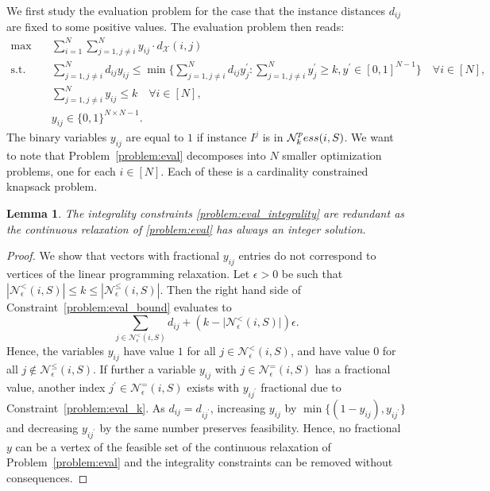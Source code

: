 \documentclass[10pt,a4paper]{amsart}
\newtheorem{lemma}{Lemma}
\newcommand{\FRil}[1]{\todo[color=black, textcolor=white, inline, author=FR]{#1}}
\newcommand{\X}{{\mathcal{X}}} %
\newcommand{\fsel}{S} %
\newcommand{\instanceindex}{i}
\newcommand{\instanceindextwo}{j}
\newcommand{\neighbour}{\ensuremath{\mathcal{N}}}
\newcommand{\sEpsBorder}[1][(\instanceindex,\selectionset)]{\ensuremath{\neighbour^=_\epsilon#1}}
\newcommand{\sEpsNeighbour}[1][(\instanceindex,\selectionset)]{\ensuremath{\neighbour^\le_\epsilon#1}}
\newcommand{\sEpsStrict}[1][(\instanceindex,\selectionset)]{\ensuremath{\neighbour^<_\epsilon#1}}
\newcommand{\selectionset}{\fsel}
\newcommand{\skPess}[1][(\instanceindex,\selectionset)]{\neighbour_k^\textnormal{pess}#1}
\newcommand{\soldist}[1][(\instanceindex,\instanceindextwo)]{d_\X#1} %
\begin{document}
We first study the evaluation problem for the case that the instance distances $d_{ij}$ are fixed to some positive values.
The evaluation problem then reads:
\begin{subequations}\label{problem:eval}
	\begin{align}
		\max \quad & \sum_{i=1}^N \sum_{j=1, j\neq i}^Ny_{ij} \cdot \soldist \\
		\label{problem:eval_bound}\text{s.t.}\quad & \sum_{j=1, j\neq i}^N d_{ij}y_{ij} \leq \min \Big\{ \sum_{j=1, j\neq i}^N d_{ij}y^\prime_{j} \colon \sum_{j=1, j\neq i}^N y^\prime_j \geq k, y^\prime \in [0,1]^{N-1} \Big\} \quad \forall i\in [N],\\
		\label{problem:eval_k}& \sum_{j=1,j\neq i}^N y_{ij} \leq k \quad \forall i\in [N],\\
		\label{problem:eval_integrality}& y_{ij}\in \{0, 1\}^{N \times N-1}.
	\end{align}
\end{subequations}
The binary variables $y_{ij}$ are equal to $1$ if instance $I^j$ is in $\skPess$.  
We want to note that Problem~\eqref{problem:eval} decomposes into $N$ smaller optimization problems, one for each $i \in [N]$. Each of these is a cardinality constrained knapsack problem.
\begin{lemma}
	The integrality constraints \eqref{problem:eval_integrality} are redundant as the continuous relaxation of \eqref{problem:eval} has always an integer solution.
\end{lemma}
\begin{proof}
We show that vectors with fractional $y_{ij}$ entries do not
  correspond to vertices of the linear programming relaxation.
	Let $\epsilon > 0$ be such that $ |\sEpsStrict| \leq k \leq |\sEpsNeighbour|$. Then the right hand side of Constraint~\eqref{problem:eval_bound} evaluates to
	\begin{equation*}
		\sum_{j \in \sEpsStrict} d_{ij} + (k - \lvert \sEpsStrict \rvert) \epsilon.
	\end{equation*}
	Hence, the variables $y_{ij}$ have value $1$ for all $j \in \sEpsStrict$, and have value $0$ for all $j\notin \sEpsNeighbour$.
	If further a variable $y_{ij}$ with $j \in \sEpsBorder$ has a fractional value, another index $j^\prime \in \sEpsBorder$ exists with $y_{ij^\prime}$ fractional due to Constraint~\eqref{problem:eval_k}. As $d_{ij} = d_{ij^\prime}$, increasing $y_{ij}$ by $\min\{(1 - y_{ij}), y_{ij^\prime}\}$ and decreasing $y_{ij^\prime}$ by the same number preserves feasibility. Hence, no fractional $y$ can be a vertex of the feasible set of the continuous relaxation of Problem~\eqref{problem:eval} and the integrality constraints can be removed without consequences.
\end{proof}
\end{document}
